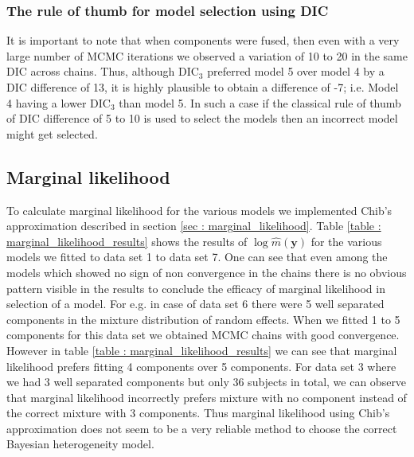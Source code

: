 \subsubsection{The rule of thumb for model selection using DIC}
It is important to note that when components were fused, then even with a very large number of MCMC iterations we observed a variation of 10 to 20 in the same DIC across chains. Thus, although $\text{DIC}_3$ preferred model 5 over model 4 by a DIC difference of 13, it is highly plausible to obtain a difference of -7; i.e. Model 4 having a lower $\text{DIC}_3$ than model 5. In such a case if the classical rule of thumb of DIC difference of 5 to 10 is used to select the models then an incorrect model might get selected.

\subsection{Marginal likelihood}
\label{subsec : marginal_likelihood_simulation}
To calculate marginal likelihood for the various models we implemented Chib's approximation described in section \ref{sec : marginal_likelihood}. Table \ref{table : marginal_likelihood_results} shows the results of $\log{\hat{m}(\boldsymbol{y})}$ for the various models we fitted to data set 1 to data set 7. One can see that even among the  models which showed no sign of non convergence in the chains there is no obvious pattern visible in the results to conclude the efficacy of marginal likelihood in selection of a model. For e.g. in case of data set 6 there were 5 well separated components in the mixture distribution of random effects. When we fitted 1 to 5 components for this data set we obtained MCMC chains with good convergence. However in table \ref{table : marginal_likelihood_results} we can see that marginal likelihood prefers fitting 4 components over 5 components. For data set 3 where we had 3 well separated components but only 36 subjects in total, we can observe that marginal likelihood incorrectly prefers mixture with no component instead of the correct mixture with 3 components. Thus marginal likelihood using Chib's approximation does not seem to be a very reliable method to choose the correct Bayesian heterogeneity model.

